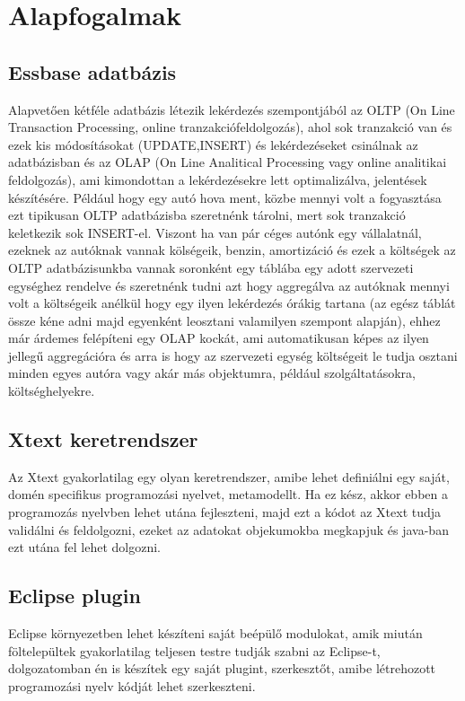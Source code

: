 \chapter{Alapfogalmak}\label{sect:Preliminaries}
\section{Essbase adatbázis}
Alapvetően kétféle adatbázis létezik lekérdezés szempontjából az OLTP (On Line
Transaction Processing, online tranzakciófeldolgozás), ahol sok tranzakció van és ezek kis
módosításokat (UPDATE,INSERT) és lekérdezéseket csinálnak az
adatbázisban és az OLAP (On Line Analitical Processing vagy online
analitikai feldolgozás), ami kimondottan a lekérdezésekre lett optimalizálva,
jelentések készítésére. Például hogy egy autó hova ment, közbe mennyi volt a
fogyasztása ezt tipikusan OLTP adatbázisba szeretnénk tárolni, mert sok
tranzakció keletkezik sok INSERT-el. Viszont ha van pár céges autónk egy vállalatnál, ezeknek az autóknak vannak kölségeik, 
benzin, amortizáció és ezek a költségek az OLTP adatbázisunkba vannak soronként
egy táblába egy adott szervezeti egységhez rendelve és szeretnénk tudni azt
hogy aggregálva az autóknak mennyi volt a költségeik anélkül hogy egy ilyen
lekérdezés órákig tartana (az egész táblát össze kéne adni majd egyenként
leosztani valamilyen szempont alapján), ehhez már árdemes felépíteni egy OLAP
kockát, ami automatikusan képes az ilyen jellegű aggregációra és arra is hogy az
szervezeti egység költségeit le tudja osztani minden egyes autóra vagy akár más
objektumra, például szolgáltatásokra, költséghelyekre.

\section{Xtext keretrendszer}
Az Xtext gyakorlatilag egy olyan keretrendszer, amibe lehet definiálni egy
saját, domén specifikus programozási nyelvet, metamodellt. Ha ez kész, akkor
ebben a programozás nyelvben lehet utána fejleszteni, majd ezt a kódot az Xtext tudja validálni 
és feldolgozni, ezeket az adatokat objekumokba megkapjuk és java-ban ezt utána
fel lehet dolgozni.

\section{Eclipse plugin}
Eclipse környezetben lehet készíteni saját beépülő modulokat, amik miután
föltelepültek gyakorlatilag teljesen testre tudják szabni az Eclipse-t,
dolgozatomban én is készítek egy saját plugint, szerkesztőt, amibe létrehozott
programozási nyelv kódját lehet szerkeszteni.

